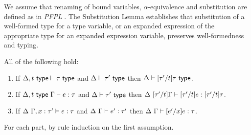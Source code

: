 We assume that renaming of bound variables, $\alpha$-equivalence and substitution are defined as in \emph{PFPL} \cite{pfpl}. The Substitution Lemma establishes that substitution of a well-formed type for a type variable, or an expanded expression of the appropriate type for an expanded expression variable, preserves well-formedness and typing. 
\begin{lemma}[Substitution]\label{lemma:substitution-U} All of the following hold:
\begin{enumerate}
\item If $\Delta, t~\mathsf{type} \vdash \tau~\mathsf{type}$ and $\Delta \vdash \tau'~\mathsf{type}$ then $\Delta \vdash [\tau'/t]\tau~\mathsf{type}$.
\item If $\Delta, t~\mathsf{type}~\Gamma \vdash e : \tau$ and $\Delta \vdash \tau'~\mathsf{type}$ then $\Delta~[\tau'/t]\Gamma \vdash [\tau'/t]e : [\tau'/t]\tau$.
\item If $\Delta~\Gamma, x : \tau' \vdash e : \tau$ and $\Delta~\Gamma \vdash e' : \tau'$ then $\Delta~\Gamma \vdash [e'/x]e : \tau$.
\end{enumerate}\end{lemma}
\begin{proof-sketch}
For each part, by rule induction on the first assumption.
\end{proof-sketch}


